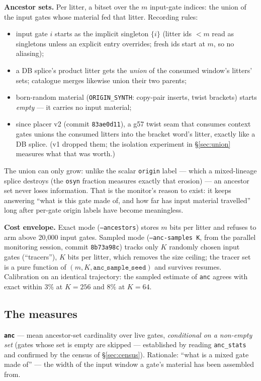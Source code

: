 \documentclass[11pt]{article}
\newcommand{\code}[1]{\texttt{#1}}
\begin{document}
\textbf{Ancestor sets.} Per litter, a bitset over the $m$ input-gate
indices: the union of the input gates whose material fed that litter.
Recording rules:
\begin{itemize}
\item input gate $i$ starts as the implicit singleton $\{i\}$ (litter ids
$< m$ read as singletons unless an explicit entry overrides; fresh ids
start at $m$, so no aliasing);
\item a DB splice's product litter gets the \emph{union} of the consumed
window's litters' sets; catalogue merges likewise union their two parents;
\item born-random material (\code{ORIGIN\_SYNTH}: copy-pair inserts, twist
brackets) starts \emph{empty} --- it carries no input material;
\item since placer v2 (commit \code{83ae0d11}), a g57 twist seam that
consumes context gates unions the consumed litters into the bracket word's
litter, exactly like a DB splice. (v1 dropped them; the isolation experiment
in \S\ref{sec:union} measures what that was worth.)
\end{itemize}
The union can only grow: unlike the scalar \code{origin} label --- which a
mixed-lineage splice destroys (the \code{osyn} fraction measures exactly
that erosion) --- an ancestor set never loses information. That is the
monitor's reason to exist: it keeps answering ``what is this gate made of,
and how far has input material travelled'' long after per-gate origin labels
have become meaningless.

\textbf{Cost envelope.} Exact mode (\code{--ancestors}) stores $m$ bits per
litter and refuses to arm above 20{,}000 input gates. Sampled mode
(\code{--anc-samples K}, from the parallel monitoring session, commit
\code{8b73a98c}) tracks only $K$ randomly chosen input gates (``tracers''),
$K$ bits per litter, which removes the size ceiling; the tracer set is a
pure function of $(m, K, \code{anc\_sample\_seed})$ and survives resumes.
Calibration on an identical trajectory: the sampled estimate of \code{anc}
agrees with exact within $3\%$ at $K{=}256$ and $8\%$ at $K{=}64$.

\subsection{The measures}

\textbf{\code{anc}} --- mean ancestor-set cardinality over live gates,
\emph{conditional on a non-empty set} (gates whose set is empty are skipped
--- established by reading \code{anc\_stats} and confirmed by the census of
\S\ref{sec:census}). Rationale: ``what is a mixed gate made of'' --- the
width of the input window a gate's material has been assembled from.
\end{document}
